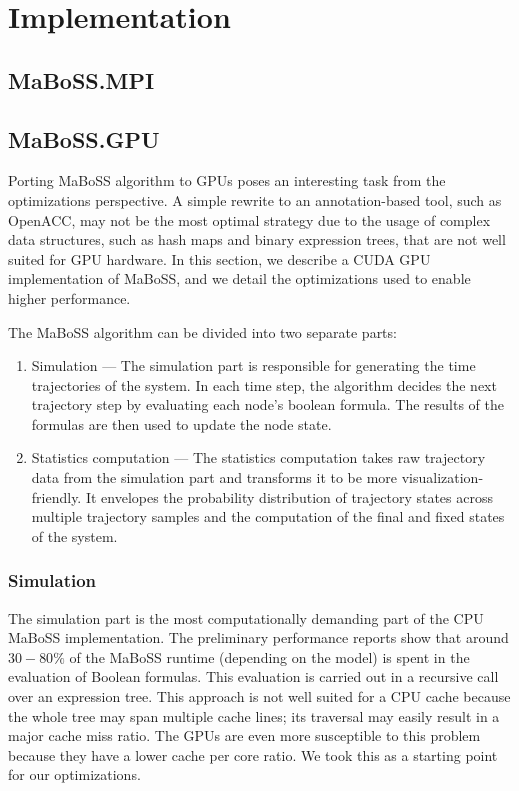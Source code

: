 \documentclass[times, twoside]{zHenriquesLab-StyleBioRxiv}
\begin{document}
\section*{Implementation}
\subsection*{MaBoSS.MPI}

\subsection*{MaBoSS.GPU}
Porting MaBoSS algorithm to GPUs poses an interesting task from the optimizations perspective. A simple rewrite to an annotation-based tool, such as OpenACC, may not be the most optimal strategy due to the usage of complex data structures, such as hash maps and binary expression trees, that are not well suited for GPU hardware. In this section, we describe a CUDA GPU implementation of MaBoSS, and we detail the optimizations used to enable higher performance.

The MaBoSS algorithm can be divided into two separate parts:
\begin{enumerate}
    \item Simulation --- The simulation part is responsible for generating the time trajectories of the system. In each time step, the algorithm decides the next trajectory step by evaluating each node's boolean formula. The results of the formulas are then used to update the node state.
    \item Statistics computation --- The statistics computation takes raw trajectory data from the simulation part and transforms it to be more visualization-friendly. It envelopes the probability distribution of trajectory states across multiple trajectory samples and the computation of the final and fixed states of the system.
\end{enumerate}

\subsubsection*{Simulation}

The simulation part is the most computationally demanding part of the CPU MaBoSS implementation. The preliminary performance reports show that around $30-80\%$ of the MaBoSS runtime (depending on the model) is spent in the evaluation of Boolean formulas. This evaluation is carried out in a recursive call over an expression tree. This approach is not well suited for a CPU cache because the whole tree may span multiple cache lines; its traversal may easily result in a major cache miss ratio. The GPUs are even more susceptible to this problem because they have a lower cache per core ratio. We took this as a starting point for our optimizations.
\end{document}
